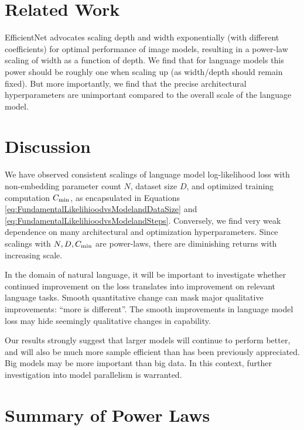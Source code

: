 \documentclass[english]{article}
\begin{document}
\section{Related Work}

EfficientNet \cite{DBLP:journals/corr/abs-1905-11946}   advocates scaling depth and width exponentially (with different coefficients) for optimal performance of image models, resulting in a power-law scaling of width as a function of depth.    We find that for language models this power should be roughly one when scaling up (as width/depth should remain fixed). But more importantly, we find that the precise architectural hyperparameters are unimportant compared to the overall scale of the language model.

\section{Discussion}


We have observed consistent scalings of language model log-likelihood loss with non-embedding parameter count $N$, dataset size $D$, and optimized training computation $C_{\rm min}$, as encapsulated in Equations \eqref{eq:FundamentalLikelihioodvsModelandDataSize} and \eqref{eq:FundamentalLikelihioodvsModelandSteps}.  Conversely, we find very weak dependence on many architectural and optimization hyperparameters.  Since scalings with $N, D, C_{\rm min}$ are power-laws, there are diminishing returns with increasing scale.

In the domain of natural language, it will be important to investigate whether continued improvement on the loss translates into improvement on relevant language tasks.  Smooth quantitative change can mask major qualitative improvements: ``more is different''.  The smooth improvements in language model loss may hide seemingly qualitative changes in capability.

Our results strongly suggest that larger models will continue to perform better, and will also be much more sample efficient than has been previously appreciated.  Big models may be more important than big data.  In this context, further investigation into model parallelism is warranted.

\newpage
\appendix
\appendixpage
\addappheadtotoc 


\section{Summary of Power Laws}
\end{document}

